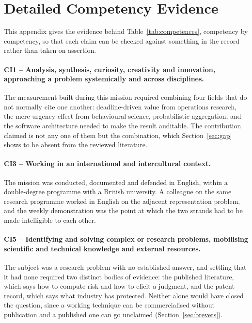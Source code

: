 \section{Detailed Competency Evidence}
\label{app:competences}

This appendix gives the evidence behind Table~\ref{tab:competences}, competency by
competency, so that each claim can be checked against something in the record rather than
taken on assertion.

\paragraph{CI1 -- Analysis, synthesis, curiosity, creativity and innovation, approaching a
problem systemically and across disciplines.}
The measurement built during this mission required combining four fields that do not normally
cite one another: deadline-driven value from operations research, the mere-urgency effect
from behavioural science, probabilistic aggregation, and the software architecture needed to
make the result auditable. The contribution claimed is not any one of them but the
combination, which Section~\ref{sec:gap} shows to be absent from the reviewed literature.

\paragraph{CI3 -- Working in an international and intercultural context.}
The mission was conducted, documented and defended in English, within a double-degree
programme with a British university. A colleague on the same research programme worked in
English on the adjacent representation problem, and the weekly demonstration was the point at
which the two strands had to be made intelligible to each other.

\paragraph{CI5 -- Identifying and solving complex or research problems, mobilising scientific
and technical knowledge and external resources.}
The subject was a research problem with no established answer, and settling that it had none
required two distinct bodies of evidence: the published literature, which says how to compute
risk and how to elicit a judgment, and the patent record, which says what industry has
protected. Neither alone would have closed the question, since a working technique can be
commercialised without publication and a published one can go unclaimed
(Section~\ref{sec:brevets}).

